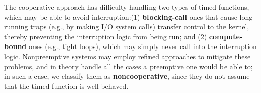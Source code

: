 The cooperative approach has difficulty handling two types of timed functions, which
may be able to avoid interruption:\@ (1) \textbf{blocking-call} ones that cause
long-running traps (e.g., by making I/O system calls) transfer control to the kernel,
thereby preventing the interruption logic from being run; and (2)
\textbf{compute-bound} ones (e.g., tight loops), which may simply never call into the
interruption logic.  Nonpreemptive systems may employ refined approaches to mitigate
these problems, and in theory handle all the cases a preemptive one would be able to;
in such a case, we classify them as \textbf{noncooperative}, since they do not assume
that the timed function is well behaved.


